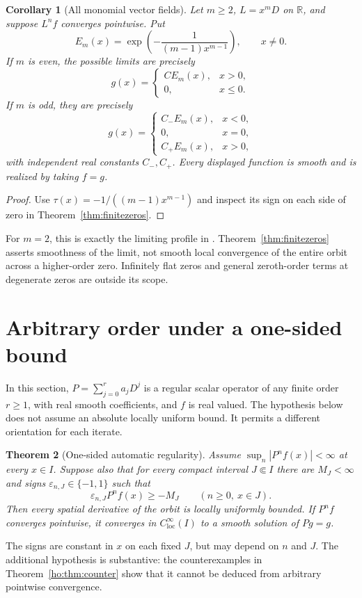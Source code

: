 \documentclass[11pt,reqno]{amsart}
\numberwithin{equation}{section}
\newtheorem{theorem}{Theorem}[section]
\newtheorem{corollary}[theorem]{Corollary}
\theoremstyle{definition}
\theoremstyle{remark}
\newcommand{\R}{\mathbb R}
\newcommand{\C}{\mathbb C}
\newcommand{\loc}{\mathrm{loc}}
\newcommand{\clim}{C^\infty_{\loc}}
\begin{document}
\begin{corollary}[All monomial vector fields]\label{cor:monomials}
Let $m\ge2$, $L=x^mD$ on $\R$, and suppose $L^nf$ converges pointwise. Put
\[
 E_m(x)=\exp\left(-\frac{1}{(m-1)x^{m-1}}\right),\qquad x\ne0.
\]
If $m$ is even, the possible limits are precisely
\[
 g(x)=\begin{cases} C E_m(x),&x>0,\\0,&x\le0.\end{cases}
\]
If $m$ is odd, they are precisely
\[
 g(x)=\begin{cases} C_-E_m(x),&x<0,\\0,&x=0,\\C_+E_m(x),&x>0,\end{cases}
\]
with independent real constants $C_-,C_+$. Every displayed function is smooth and is realized by taking $f=g$.
\end{corollary}
\begin{proof}
Use $\tau(x)=-1/((m-1)x^{m-1})$ and inspect its sign on each side of zero in Theorem~\ref{thm:finitezeros}.
\end{proof}
For $m=2$, this is exactly the limiting profile in \cite{project}. Theorem~\ref{thm:finitezeros} asserts smoothness of the limit, not smooth local convergence of the entire orbit across a higher-order zero. Infinitely flat zeros and general zeroth-order terms at degenerate zeros are outside its scope.

\section{Arbitrary order under a one-sided bound}\label{sec:onesided}
In this section, $P=\sum_{j=0}^r a_jD^j$ is a regular scalar operator of any finite order $r\ge1$, with real smooth coefficients, and $f$ is real valued. The hypothesis below does not assume an absolute locally uniform bound. It permits a different orientation for each iterate.

\begin{theorem}[One-sided automatic regularity]\label{thm:oneside}
Assume $\sup_n|P^nf(x)|<\infty$ at every $x\in I$. Suppose also that for every compact interval $J\Subset I$ there are $M_J<\infty$ and signs $\varepsilon_{n,J}\in\{-1,1\}$ such that
\begin{equation}\label{eq:oneside}
 \varepsilon_{n,J}P^nf(x)\ge-M_J
 \qquad(n\ge0,\ x\in J).
\end{equation}
Then every spatial derivative of the orbit is locally uniformly bounded. If $P^nf$ converges pointwise, it converges in $\clim(I)$ to a smooth solution of $Pg=g$.
\end{theorem}
The signs are constant in $x$ on each fixed $J$, but may depend on $n$ and $J$. The additional hypothesis is substantive: the counterexamples in Theorem~\ref{ho:thm:counter} show that it cannot be deduced from arbitrary pointwise convergence.
\end{document}
